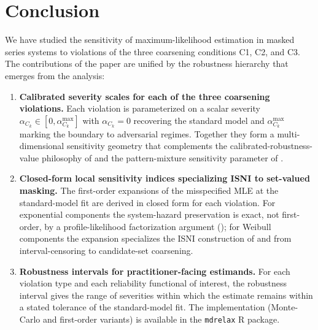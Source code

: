 \section{Conclusion}
\label{sec:conclusion}

We have studied the sensitivity of maximum-likelihood estimation in masked
series systems to violations of the three coarsening conditions C1, C2,
and C3. The contributions of the paper are unified by the robustness
hierarchy that emerges from the analysis:

\begin{enumerate}
    \item \textbf{Calibrated severity scales for each of the three
        coarsening violations.} Each violation is parameterized on a
        scalar severity $\alpha_{C_k} \in [0, \alpha_{C_k}^{\max}]$ with
        $\alpha_{C_k} = 0$ recovering the standard model and
        $\alpha_{C_k}^{\max}$ marking the boundary to adversarial
        regimes. Together they form a multi-dimensional sensitivity
        geometry that complements the calibrated-robustness-value
        philosophy of \citet{CinelliHazlett2020} and the pattern-mixture
        sensitivity parameter of \citet{MorenoBetancur2015}.

    \item \textbf{Closed-form local sensitivity indices specializing
        ISNI to set-valued masking.} The first-order expansions of the
        misspecified MLE at the standard-model fit are derived in
        closed form for each violation. For exponential components the
        system-hazard preservation is exact, not first-order, by a
        profile-likelihood factorization argument
        (); for Weibull components the
        expansion specializes the ISNI construction of
        \citet{TroxelMaHeitjan2004} and \citet{ZhangHeitjan2006} from
        interval-censoring to candidate-set coarsening.

    \item \textbf{Robustness intervals for practitioner-facing
        estimands.} For each violation type and each reliability
        functional of interest, the robustness interval gives the range
        of severities within which the estimate remains within a stated
        tolerance of the standard-model fit. The implementation
        (Monte-Carlo and first-order variants) is available in the
        \texttt{mdrelax} R package.


\end{enumerate}
